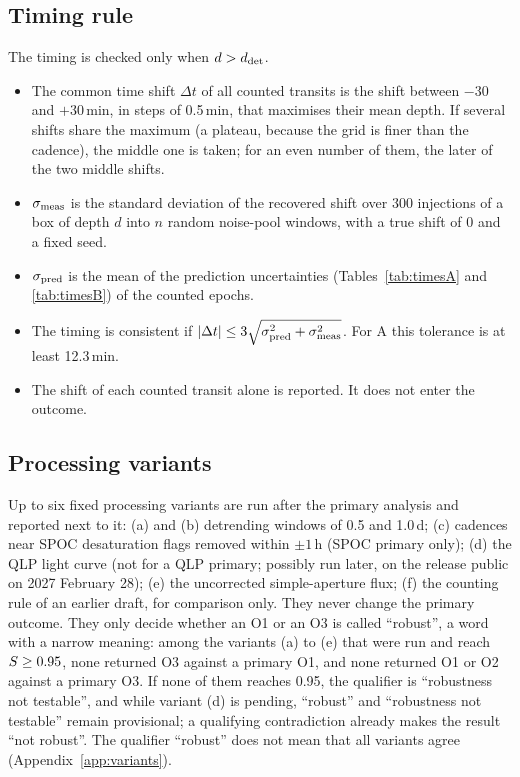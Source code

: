 \subsection{Timing rule} \label{sec:timing}

The timing is checked only when $d > d_{\rm det}$.
\begin{itemize}
\item The common time shift $\Delta t$ of all counted transits is the shift between $-30$ and $+30$\,min, in steps of
  0.5\,min, that maximises their mean depth. If several shifts share the maximum (a plateau, because the grid is finer
  than the cadence), the middle one is taken; for an even number of them, the later of the two middle shifts.
\item $\sigma_{\rm meas}$ is the standard deviation of the recovered shift over 300 injections of a box of depth $d$ into
  $n$ random noise-pool windows, with a true shift of 0 and a fixed seed.
\item $\sigma_{\rm pred}$ is the mean of the prediction uncertainties (Tables~\ref{tab:timesA} and \ref{tab:timesB}) of
  the counted epochs.
\item The timing is consistent if $|\Delta t| \leq 3\sqrt{\sigma_{\rm pred}^2 + \sigma_{\rm meas}^2}$. For A this
  tolerance is at least 12.3\,min.
\item The shift of each counted transit alone is reported. It does not enter the outcome.
\end{itemize}

\subsection{Processing variants}

Up to six fixed processing variants are run after the primary analysis and reported next to it: (a) and (b)
detrending windows of 0.5 and 1.0\,d; (c) cadences near SPOC desaturation flags removed within $\pm1$\,h (SPOC primary only); (d) the QLP
light curve (not for a QLP primary; possibly run later, on the release public on 2027 February 28); (e) the uncorrected
simple-aperture flux; (f) the counting rule of an earlier draft, for comparison only. They never
change the primary outcome. They only decide whether an O1 or an O3 is called ``robust'', a word with a narrow meaning:
among the variants (a) to (e) that were run and reach $S \geq 0.95$, none returned O3 against a primary O1, and
none returned O1 or O2 against a primary O3. If none of them reaches 0.95, the qualifier is ``robustness not
testable'', and while variant (d) is pending, ``robust'' and ``robustness not testable'' remain provisional;
a qualifying contradiction already makes the result ``not robust''. The qualifier ``robust'' does not mean that all variants agree
(Appendix~\ref{app:variants}).
